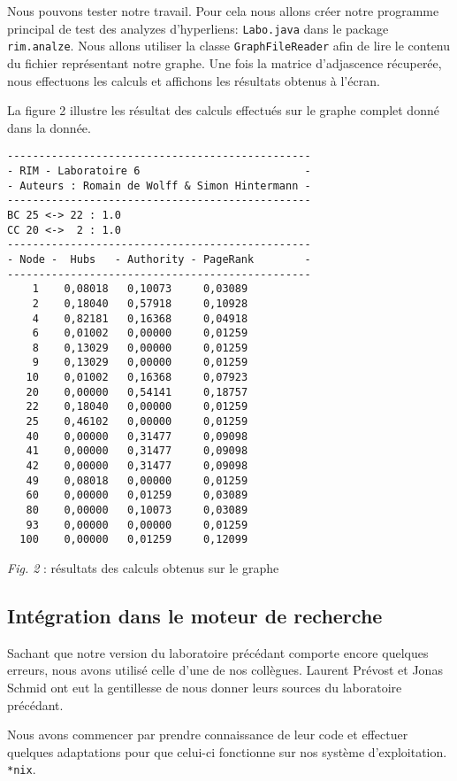 \documentclass[a4paper, 11pt]{article}
\begin{document}
Nous pouvons tester notre travail. Pour cela nous allons créer notre programme
principal de test des analyzes d'hyperliens: \texttt{Labo.java} dans le package
\texttt{rim.analze}. Nous allons utiliser la classe \texttt{GraphFileReader}
afin de lire le contenu du fichier représentant notre graphe. Une fois la
matrice d'adjascence récuperée, nous effectuons les calculs et affichons les
résultats obtenus à l'écran. 

La figure 2 illustre les résultat des calculs effectués sur le graphe complet donné dans la donnée.

\begin{lstlisting}
------------------------------------------------
- RIM - Laboratoire 6                          -
- Auteurs : Romain de Wolff & Simon Hintermann -
------------------------------------------------
BC 25 <-> 22 : 1.0
CC 20 <->  2 : 1.0
------------------------------------------------
- Node -  Hubs   - Authority - PageRank        -
------------------------------------------------
    1    0,08018   0,10073     0,03089
    2    0,18040   0,57918     0,10928
    4    0,82181   0,16368     0,04918
    6    0,01002   0,00000     0,01259
    8    0,13029   0,00000     0,01259
    9    0,13029   0,00000     0,01259
   10    0,01002   0,16368     0,07923
   20    0,00000   0,54141     0,18757
   22    0,18040   0,00000     0,01259
   25    0,46102   0,00000     0,01259
   40    0,00000   0,31477     0,09098
   41    0,00000   0,31477     0,09098
   42    0,00000   0,31477     0,09098
   49    0,08018   0,00000     0,01259
   60    0,00000   0,01259     0,03089
   80    0,00000   0,10073     0,03089
   93    0,00000   0,00000     0,01259
  100    0,00000   0,01259     0,12099
\end{lstlisting}
\begin{center}
	\emph{Fig. 2} : résultats des calculs obtenus sur le graphe
\end{center}

\subsection{Intégration dans le moteur de recherche}

Sachant que notre version du laboratoire précédant comporte encore quelques
erreurs, nous avons utilisé celle d'une de nos collègues. Laurent Prévost et
Jonas Schmid ont eut la gentillesse de nous donner leurs sources du laboratoire
précédant.

Nous avons commencer par prendre connaissance de leur code et effectuer quelques
adaptations pour que celui-ci fonctionne sur nos système d'exploitation.
\texttt{*nix}.
\end{document}
